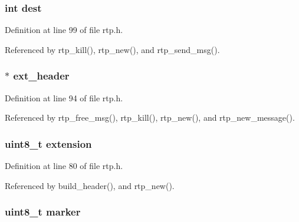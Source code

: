 \hypertarget{struct___r_t_p_session_ae5163ff230abd4115d86194ad89467b5}{
\subsubsection[{dest}]{\setlength{\rightskip}{0pt plus 5cm}int dest}}\label{struct___r_t_p_session_ae5163ff230abd4115d86194ad89467b5}


Definition at line 99 of file rtp.\+h.



Referenced by rtp\+\_\+kill(), rtp\+\_\+new(), and rtp\+\_\+send\+\_\+msg().

\hypertarget{struct___r_t_p_session_aa0a69d899b1bee283ae1490f53bcd073}{
\subsubsection[{ext\+\_\+header}]{$\ast$ ext\+\_\+header}}\label{struct___r_t_p_session_aa0a69d899b1bee283ae1490f53bcd073}


Definition at line 94 of file rtp.\+h.



Referenced by rtp\+\_\+free\+\_\+msg(), rtp\+\_\+kill(), rtp\+\_\+new(), and rtp\+\_\+new\+\_\+message().

\hypertarget{struct___r_t_p_session_a91c592cf70c61ba0788394767185be4c}{
\subsubsection[{extension}]{\setlength{\rightskip}{0pt plus 5cm}uint8\+\_\+t extension}}\label{struct___r_t_p_session_a91c592cf70c61ba0788394767185be4c}


Definition at line 80 of file rtp.\+h.



Referenced by build\+\_\+header(), and rtp\+\_\+new().

\hypertarget{struct___r_t_p_session_ae00c35797c92d6f67470b088dc2c1876}{
\subsubsection[{marker}]{\setlength{\rightskip}{0pt plus 5cm}uint8\+\_\+t marker}}\label{struct___r_t_p_session_ae00c35797c92d6f67470b088dc2c1876}


